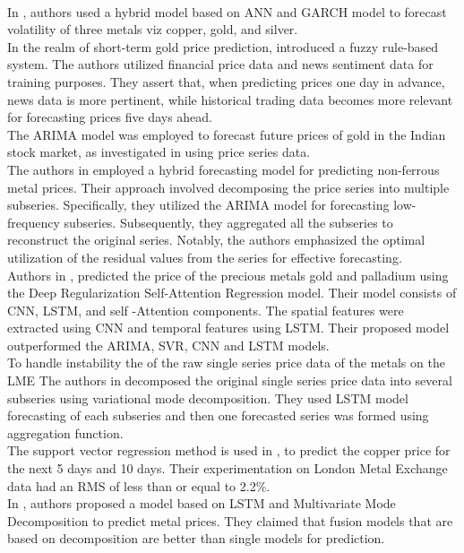 \documentclass{ws-ijait}
\begin{document}
\cite{kriechbaumer2014improved}\\
In \cite{kristjanpoller2017volatility}, authors used a hybrid model based on ANN and GARCH model to forecast volatility of three metals viz copper, gold, and silver.\\
In the realm of short-term gold price prediction, \cite{hajek2022fuzzy} introduced a fuzzy rule-based system. The authors utilized financial price data and news sentiment data for training purposes. They assert that, when predicting prices one day in advance, news data is more pertinent, while historical trading data becomes more relevant for forecasting prices five days ahead.\\
The ARIMA model was employed to forecast future prices of gold in the Indian stock market, as investigated in \cite{guha2016gold} using price series data.\\
The authors in \cite{he2023novel} employed a hybrid forecasting model for predicting non-ferrous metal prices. Their approach involved decomposing the price series into multiple subseries. Specifically, they utilized the ARIMA model for forecasting low-frequency subseries. Subsequently, they aggregated all the subseries to reconstruct the original series. Notably, the authors emphasized the optimal utilization of the residual values from the series for effective forecasting.\\
Authors in \cite{zhou2019precious}, predicted the price of the precious metals gold and palladium using the Deep Regularization Self-Attention Regression model. Their model consists of CNN, LSTM, and self -Attention components. The spatial features were extracted using CNN and temporal features using LSTM. Their proposed model outperformed the ARIMA, SVR, CNN and LSTM models.\\
To handle instability the of the raw single series price data of the metals on the LME The authors in \cite{liu2020non} decomposed the original single series price data into several subseries using variational mode decomposition. They used LSTM model forecasting of each subseries and then one forecasted series was formed using aggregation function. \\
The support vector regression method is used in \cite{astudillo2020copper}, to predict the copper price for the next 5 days and 10 days. Their experimentation on London Metal Exchange data had an RMS of less than or equal to 2.2\%.\\
In \cite{li2023novel}, authors proposed a model based on LSTM and Multivariate Mode Decomposition to predict metal prices. They claimed that fusion models that are based on decomposition are better than single models for prediction.\\
\end{document}
